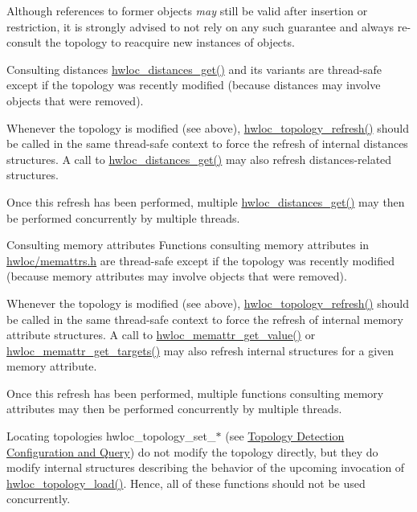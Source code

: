 \begin{DoxyDescription}
Although references to former objects {\itshape may} still be valid after insertion or restriction, it is strongly advised to not rely on any such guarantee and always re-\/consult the topology to reacquire new instances of objects. 


\item[Consulting distances ]{\ttfamily \hyperlink{a00208_ga613e6b2a5d0f06626ee8d0c12fa46691}{hwloc\+\_\+distances\+\_\+get()}} and its variants are thread-\/safe except if the topology was recently modified (because distances may involve objects that were removed).

Whenever the topology is modified (see above), {\ttfamily \hyperlink{a00194_ga698ecd640d2b76742bba3829a145cd9a}{hwloc\+\_\+topology\+\_\+refresh()}} should be called in the same thread-\/safe context to force the refresh of internal distances structures. A call to {\ttfamily \hyperlink{a00208_ga613e6b2a5d0f06626ee8d0c12fa46691}{hwloc\+\_\+distances\+\_\+get()}} may also refresh distances-\/related structures.

Once this refresh has been performed, multiple {\ttfamily \hyperlink{a00208_ga613e6b2a5d0f06626ee8d0c12fa46691}{hwloc\+\_\+distances\+\_\+get()}} may then be performed concurrently by multiple threads. 


\item[Consulting memory attributes ]Functions consulting memory attributes in \hyperlink{a00134_source}{hwloc/memattrs.\+h} are thread-\/safe except if the topology was recently modified (because memory attributes may involve objects that were removed).

Whenever the topology is modified (see above), {\ttfamily \hyperlink{a00194_ga698ecd640d2b76742bba3829a145cd9a}{hwloc\+\_\+topology\+\_\+refresh()}} should be called in the same thread-\/safe context to force the refresh of internal memory attribute structures. A call to {\ttfamily \hyperlink{a00211_ga297e4a9adc2272446a4c7449dacef0df}{hwloc\+\_\+memattr\+\_\+get\+\_\+value()}} or {\ttfamily \hyperlink{a00212_ga3177cc0ab47e4dd1fa69ca1df4c7cb1a}{hwloc\+\_\+memattr\+\_\+get\+\_\+targets()}} may also refresh internal structures for a given memory attribute.

Once this refresh has been performed, multiple functions consulting memory attributes may then be performed concurrently by multiple threads. 


\item[Locating topologies  ]{\ttfamily hwloc\+\_\+topology\+\_\+set\+\_\+$\ast$} (see \hyperlink{a00193}{Topology Detection Configuration and Query}) do not modify the topology directly, but they do modify internal structures describing the behavior of the upcoming invocation of {\ttfamily \hyperlink{a00186_gabdf58d87ad77f6615fccdfe0535ff826}{hwloc\+\_\+topology\+\_\+load()}}. Hence, all of these functions should not be used concurrently. 


\end{DoxyDescription}